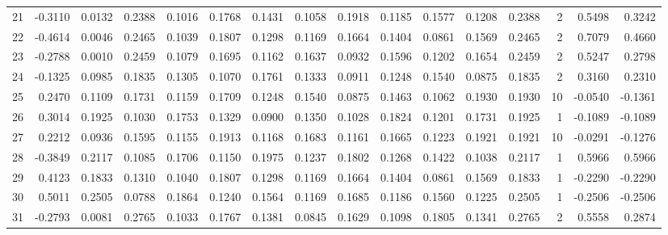 \begin{tabular}{lrrrrrrrrrrrrrrr}
21  &     -0.3110 &  0.0132 &  0.2388 &  0.1016 &  0.1768 &  0.1431 &  0.1058 &  0.1918 &  0.1185 &  0.1577 &   0.1208 &     0.2388 &      2 &                    0.5498 &                     0.3242 \\
22  &     -0.4614 &  0.0046 &  0.2465 &  0.1039 &  0.1807 &  0.1298 &  0.1169 &  0.1664 &  0.1404 &  0.0861 &   0.1569 &     0.2465 &      2 &                    0.7079 &                     0.4660 \\
23  &     -0.2788 &  0.0010 &  0.2459 &  0.1079 &  0.1695 &  0.1162 &  0.1637 &  0.0932 &  0.1596 &  0.1202 &   0.1654 &     0.2459 &      2 &                    0.5247 &                     0.2798 \\
24  &     -0.1325 &  0.0985 &  0.1835 &  0.1305 &  0.1070 &  0.1761 &  0.1333 &  0.0911 &  0.1248 &  0.1540 &   0.0875 &     0.1835 &      2 &                    0.3160 &                     0.2310 \\
25  &      0.2470 &  0.1109 &  0.1731 &  0.1159 &  0.1709 &  0.1248 &  0.1540 &  0.0875 &  0.1463 &  0.1062 &   0.1930 &     0.1930 &     10 &                   -0.0540 &                    -0.1361 \\
26  &      0.3014 &  0.1925 &  0.1030 &  0.1753 &  0.1329 &  0.0900 &  0.1350 &  0.1028 &  0.1824 &  0.1201 &   0.1731 &     0.1925 &      1 &                   -0.1089 &                    -0.1089 \\
27  &      0.2212 &  0.0936 &  0.1595 &  0.1155 &  0.1913 &  0.1168 &  0.1683 &  0.1161 &  0.1665 &  0.1223 &   0.1921 &     0.1921 &     10 &                   -0.0291 &                    -0.1276 \\
28  &     -0.3849 &  0.2117 &  0.1085 &  0.1706 &  0.1150 &  0.1975 &  0.1237 &  0.1802 &  0.1268 &  0.1422 &   0.1038 &     0.2117 &      1 &                    0.5966 &                     0.5966 \\
29  &      0.4123 &  0.1833 &  0.1310 &  0.1040 &  0.1807 &  0.1298 &  0.1169 &  0.1664 &  0.1404 &  0.0861 &   0.1569 &     0.1833 &      1 &                   -0.2290 &                    -0.2290 \\
30  &      0.5011 &  0.2505 &  0.0788 &  0.1864 &  0.1240 &  0.1564 &  0.1169 &  0.1685 &  0.1186 &  0.1560 &   0.1225 &     0.2505 &      1 &                   -0.2506 &                    -0.2506 \\
31  &     -0.2793 &  0.0081 &  0.2765 &  0.1033 &  0.1767 &  0.1381 &  0.0845 &  0.1629 &  0.1098 &  0.1805 &   0.1341 &     0.2765 &      2 &                    0.5558 &                     0.2874 \\

\end{tabular}
